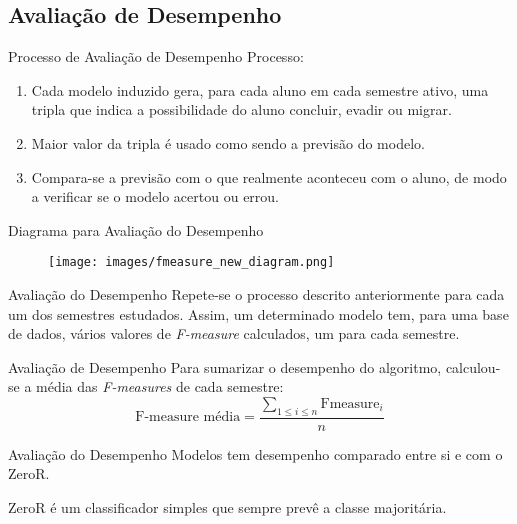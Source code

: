 \subsection{Avaliação de Desempenho}
\begin{frame}{Processo de Avaliação de Desempenho}
    Processo: 
    \begin{enumerate}
        \item Cada modelo induzido gera, para cada aluno em cada semestre ativo, uma
            tripla que indica a possibilidade do aluno concluir, evadir ou migrar. 
        \item Maior valor da tripla é usado como sendo a previsão do modelo. 
        \item Compara-se a previsão com o que realmente aconteceu com o aluno, de
            modo a verificar se o modelo acertou ou errou. 
    \end{enumerate}
\end{frame}

\begin{frame}{Diagrama para Avaliação do Desempenho}
    \begin{figure}[!ht]
        \centering
        \texttt{[image: images/fmeasure\_new\_diagram.png]}
    \end{figure}
\end{frame}

\begin{frame}{Avaliação do Desempenho}
    Repete-se o processo descrito anteriormente para cada um dos semestres estudados.
    Assim, um determinado modelo tem, para uma base de dados, vários valores de
    \textit{F-measure} calculados, um para cada semestre. 
\end{frame}

\begin{frame}{Avaliação de Desempenho}
    Para sumarizar o desempenho do algoritmo, calculou-se a média das
    \textit{F-measures} de cada semestre: 
    \begin{equation}
        \text{F-measure média} = \frac{\sum\limits_{1 \le i \le n} \text{Fmeasure}_i}
                                    {n}
    \end{equation}
\end{frame}

\begin{frame}{Avaliação do Desempenho}
    Modelos tem desempenho comparado entre si e com o ZeroR. 

    \vspace{0.5cm}

    ZeroR é um classificador simples que sempre prevê a classe majoritária. 
\end{frame}


